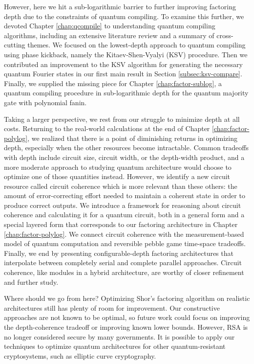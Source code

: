 However, here we hit a sub-logarithmic barrier to further improving
factoring depth due to the constraints of quantum compiling. To examine
this further, we devoted Chapter \ref{chap:qcompile} to understanding
quantum compiling algorithms, including an extensive literature review
and a summary of cross-cutting themes. We focused on the lowest-depth
approach to quantum compiling using phase kickback, namely the
Kitaev-Shen-Vyalyi (KSV) procedure.
Then we contributed an improvement to the KSV algorithm for generating
the necessary quantum Fourier states in our first main result in
Section \ref{subsec:ksv-compare}. Finally, we supplied the missing
piece for Chapter \ref{chap:factor-sublog}, a quantum compiling
procedure in sub-logarithmic depth for the quantum majority gate with
polynomial fanin.

Taking a larger perspective, we rest from our struggle to minimize depth
at all costs. Returning to the real-world calculations at the end of
Chapter \ref{chap:factor-polylog}, we realized that there is a point of
diminishing returns in optimizing depth, especially when the other
resources become intractable. Common tradeoffs with depth include
circuit size, circuit width, or the depth-width product, and a more
moderate approach to studying quantum architecture would choose to
optimize one of those quantities instead. However, we identify a new
circuit resource called circuit coherence
which is more relevant than these others: the amount
of error-correcting
effort needed to maintain a coherent state in order to produce
correct outputs. We introduce a framework for reasoning about circuit
coherence and calculating it for a quantum circuit, both in a general
form and a special layered form that corresponds to our factoring
architecture in Chapter \ref{chap:factor-polylog}. We connect circuit
coherence with the measurement-based model of quantum computation and
reversible pebble game time-space tradeoffs. Finally, we end by
presenting configurable-depth factoring architectures that interpolate
between completely serial and complete parallel approaches.
Circuit coherence, like modules in a hybrid architecture, are worthy
of closer refinement and further study.

Where should we go from here? Optimizing Shor's factoring algorithm on
realistic architectures still has plenty of room for improvement. Our
constructive approaches are not known to be optimal, so future work could
focus on improving the depth-coherence tradeoff or improving known
lower bounds. However, RSA is no longer considered secure by many
governments. It is possible to apply our techniques to optimize quantum
architectures for other quantum-resistant cryptosystems, such as
elliptic curve cryptography.

